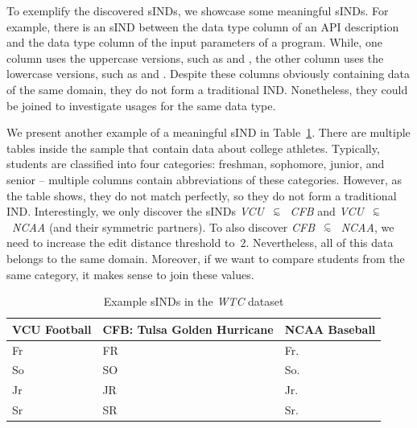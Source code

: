 To exemplify the discovered sINDs, we showcase some meaningful sINDs.
For example, there is an sIND between the data type column of an API description and the data type column of the input parameters of a program.
While, one column uses the uppercase versions, such as  and , the other column uses the lowercase versions, such as  and .
Despite these columns obviously containing data of the same domain, they do not form a traditional IND.
Nonetheless, they could be joined to investigate usages for the same data type.

We present another example of a meaningful sIND in Table~\ref{table:eval:best_matches}.
There are multiple tables inside the sample that contain data about college athletes.
Typically, students are classified into four categories: freshman, sophomore, junior, and senior -- multiple columns contain abbreviations of these categories.
However, as the table shows, they do not match perfectly, so they do not form a traditional IND.
Interestingly, we only discover the sINDs \mbox{\emph{VCU} $\simIND{}$ \emph{CFB}} and \mbox{\emph{VCU} $\simIND{}$ \emph{NCAA}} (and their symmetric partners).
To also discover \mbox{\emph{CFB} $\simIND{}$ \emph{NCAA}}, we need to increase the edit distance threshold to~2.
Nevertheless, all of this data belongs to the same domain.
Moreover, if we want to compare students from the same category, it makes sense to join these values.
\begin{table}[h]
\centering \small
\caption{Example sINDs in the \emph{WTC} dataset}
\label{table:eval:best_matches}
\begin{tabular}{@{}lll@{}}
\toprule
VCU Football	& CFB: Tulsa Golden Hurricane	& NCAA Baseball \\
\midrule
Fr 				& FR       						& Fr.     		\\
So      		& SO                            & So.     		\\
Jr    			& JR          					& Jr.     		\\
Sr    			& SR          					& Sr.    		\\
\bottomrule
\end{tabular}
\end{table}
